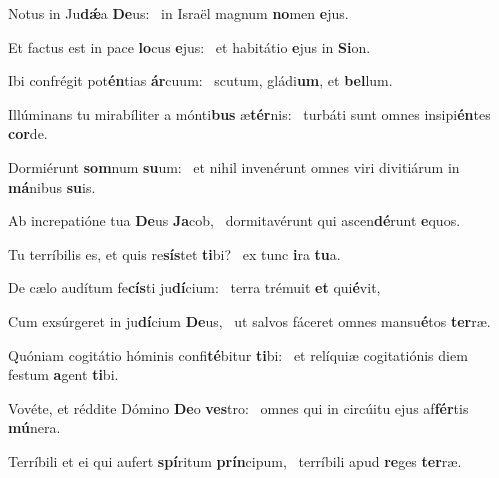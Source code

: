 \item Notus in Ju\textbf{dǽ}a \textbf{De}us:~\psstar{} in Israël magnum \textbf{no}men \textbf{e}jus.
\item Et factus est in pace \textbf{lo}cus \textbf{e}jus:~\psstar{} et habitátio \textbf{e}jus in \textbf{Si}on.
\item Ibi confrégit pot\textbf{én}tias \textbf{ár}cuum:~\psstar{} scutum, gládi\textbf{um}, et \textbf{bel}lum.
\item Illúminans tu mirabíliter a mónti\textbf{bus} æ\textbf{tér}nis:~\psstar{} turbáti sunt omnes insipi\textbf{én}tes \textbf{cor}de.
\item Dormiérunt \textbf{som}num \textbf{su}um:~\psstar{} et nihil invenérunt omnes viri divitiárum in \textbf{má}nibus \textbf{su}is.
\item Ab increpatióne tua \textbf{De}us \textbf{Ja}cob,~\psstar{} dormitavérunt qui a\-scen\textbf{dé}runt \textbf{e}quos.
\item Tu terríbilis es, et quis re\textbf{sís}tet \textbf{ti}bi?~\psstar{} ex tunc \textbf{i}ra \textbf{tu}a.
\item De cælo audítum fe\textbf{cís}ti ju\textbf{dí}cium:~\psstar{} terra trémuit \textbf{et} qui\textbf{é}vit,
\item Cum exsúrgeret in ju\textbf{dí}cium \textbf{De}us,~\psstar{} ut salvos fáceret omnes mansu\textbf{é}tos \textbf{ter}ræ.
\item Quóniam cogitátio hóminis confi\textbf{té}bitur \textbf{ti}bi:~\psstar{} et relíquiæ cogitatiónis diem festum \textbf{a}gent \textbf{ti}bi.
\item Vovéte, et réddite Dómino \textbf{De}o \textbf{ves}tro:~\psstar{} omnes qui in circúitu ejus af\textbf{fér}tis \textbf{mú}nera.
\item Terríbili et ei qui aufert \textbf{spí}ritum \textbf{prín}cipum,~\psstar{} terríbili apud \textbf{re}ges \textbf{ter}ræ.
